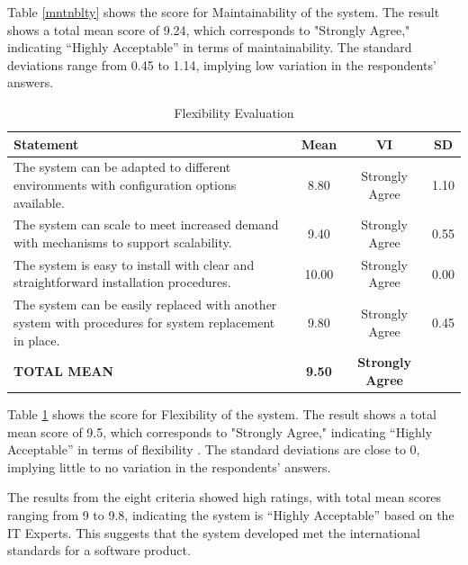 Table \ref{mntnblty} shows the score for Maintainability of the system. The result shows a total mean score of 9.24, which corresponds to "Strongly Agree," indicating “Highly Acceptable” in terms of maintainability. The standard deviations range from 0.45 to 1.14, implying low variation in the respondents’ answers.

\begin{table}[ht]
	\centering
	\caption{Flexibility Evaluation}
	\label{flxblty}
	\renewcommand{\arraystretch}{1.2}
	\begin{tabularx}{\linewidth}{|X|c|c|c|}
		\hline
		\textbf{Statement} & \textbf{Mean} & \textbf{VI} & \textbf{SD} \\ \hline
		The system can be adapted to different environments with configuration options available.
		& 8.80 & Strongly Agree & 1.10 \\ \hline
		The system can scale to meet increased demand with mechanisms to support scalability.
		& 9.40 & Strongly Agree & 0.55 \\ \hline
		The system is easy to install with clear and straightforward installation procedures.
		& 10.00 & Strongly Agree & 0.00 \\ \hline
		The system can be easily replaced with another system with procedures for system replacement in place.
		& 9.80 & Strongly Agree & 0.45 \\ \hline
		\textbf{TOTAL MEAN} & \textbf{9.50} & \textbf{Strongly Agree} & \\ \hline
	\end{tabularx}
\end{table}

Table \ref{flxblty} shows the score for Flexibility of the system. The result shows a total mean score of 9.5, which corresponds to "Strongly Agree," indicating “Highly Acceptable” in terms of flexibility . The standard deviations are close to 0, implying little to no variation in the respondents’ answers.

The results from the eight criteria showed high ratings, with total mean scores ranging from 9 to 9.8, indicating the system is “Highly Acceptable” based on the IT Experts. This suggests that the system developed met the international standards for a software product.
